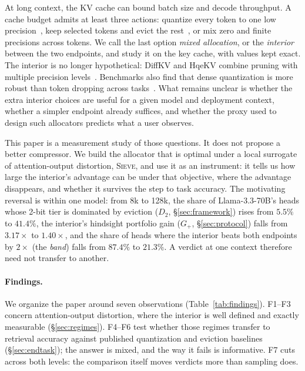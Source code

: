 \documentclass{article}
\newcommand{\sieve}{\textsc{Sieve}}
\newcommand{\gplus}{G_{+}}
\theoremstyle{definition}
\begin{document}
At long context, the KV cache can bound batch size and decode throughput.  A cache budget admits at least three actions: quantize every token to one low precision~\citep{liu2024kivi,hooper2024kvquant,zandieh2025turboquant}, keep selected tokens and evict the rest~\citep{zhang2023h2o,liu2023scissorhands,li2024snapkv,xiao2024streamingllm}, or mix zero and finite precisions across tokens.  We call the last option \emph{mixed allocation}, or the \emph{interior} between the two endpoints, and study it on the key cache, with values kept exact.  The interior is no longer hypothetical: DiffKV and HqeKV combine pruning with multiple precision levels~\citep{zhang2025diffkv,wang-etal-2026-hqekv}.  Benchmarks also find that dense quantization is more robust than token dropping across tasks~\citep{yuan2024kvbench}.  What remains unclear is whether the extra interior choices are useful for a given model and deployment context, whether a simpler endpoint already suffices, and whether the proxy used to design such allocators predicts what a user observes.

This paper is a measurement study of those questions.  It does not propose a better compressor.  We build the allocator that is optimal under a local surrogate of attention-output distortion, \sieve{}, and use it as an instrument: it tells us how large the interior's advantage can be under that objective, where the advantage disappears, and whether it survives the step to task accuracy.  The motivating reversal is within one model: from 8k to 128k, the share of Llama-3.3-70B's heads whose 2-bit tier is dominated by eviction ($D_2$, \S\ref{sec:framework}) rises from $5.5\%$ to $41.4\%$, the interior's hindsight portfolio gain ($\gplus$, \S\ref{sec:protocol}) falls from $3.17\times$ to $1.40\times$, and the share of heads where the interior beats both endpoints by $2\times$ (the \emph{band}) falls from $87.4\%$ to $21.3\%$.  A verdict at one context therefore need not transfer to another.

\paragraph{Findings.}  We organize the paper around seven observations (Table~\ref{tab:findings}).  F1--F3 concern attention-output distortion, where the interior is well defined and exactly measurable (\S\ref{sec:regimes}).  F4--F6 test whether those regimes transfer to retrieval accuracy against published quantization and eviction baselines (\S\ref{sec:endtask}); the answer is mixed, and the way it fails is informative.  F7 cuts across both levels: the comparison itself moves verdicts more than sampling does.
\end{document}
